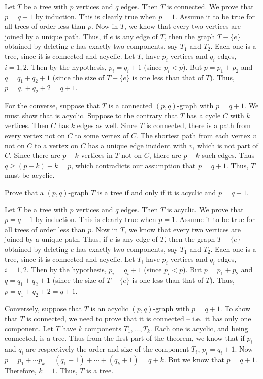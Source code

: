 \begin{Solution*}
Let $T$ be a tree with $p$ vertices and $q$ edges. Then $T$ is connected. We prove that $p = q + 1$ by induction. This is clearly true when $p = 1$. Assume it to be true for all trees of order less than $p$. Now in $T$, we know that every two vertices are joined by a unique path. Thus, if $e$ is any edge of $T$, then the graph $T - \{e\}$ obtained by deleting $e$ has exactly two components, say $T_1$ and $T_2$. Each one is a tree, since it is connected and acyclic. Let $T_i$ have $p_i$ vertices and $q_i$ edges, $i = 1, 2$. Then by the hypothesis, $p_i = q_i + 1$ (since $p_i < p$). But $p = p_1 + p_2$ and $q = q_1 + q_2 + 1$ (since the size of $T - \{e\}$ is one less than that of $T$). Thus, $p = q_1 + q_2 + 2 = q + 1$.

For the converse, suppose that $T$ is a connected $(p,q)$-graph with $p = q + 1$. We must show that is acyclic. Suppose to the contrary that $T$ has a cycle $C$ with $k$ vertices. Then $C$ has $k$ edges as well. Since $T$ is connected, there is a path from every vertex not on $C$ to some vertex of $C$. The shortest path from each vertex $v$ not on $C$ to a vertex on $C$ has a unique edge incident with $v$, which is not part of $C$. Since there are $p - k$ vertices in $T$ not on $C$, there are $p - k$ such edges. Thus $q \ge (p - k) + k = p$, which contradicts our assumption that $p = q + 1$. Thus, $T$ must be acyclic.
\end{Solution*}

\begin{DExercise}\label{exer:Acyc;p=q+1}
Prove that a $(p,q)$-graph $T$ is a tree if and only if it is acyclic and $p = q + 1$.
\end{DExercise}

\begin{Solution*}
Let $T$ be a tree with $p$ vertices and $q$ edges. Then $T$ is acyclic. We prove that $p = q + 1$ by induction. This is clearly true when $p = 1$. Assume it to be true for all trees of order less than $p$. Now in $T$, we know that every two vertices are joined by a unique path. Thus, if $e$ is any edge of $T$, then the graph $T - \{e\}$ obtained by deleting $e$ has exactly two components, say $T_1$ and $T_2$. Each one is a tree, since it is connected and acyclic. Let $T_i$ have $p_i$ vertices and $q_i$ edges, $i = 1, 2$. Then by the hypothesis, $p_i = q_i + 1$ (since $p_i < p$). But $p = p_1 + p_2$ and $q = q_1 + q_2 + 1$ (since the size of $T - \{e\}$ is one less than that of $T$). Thus, $p = q_1 + q_2 + 2 = q + 1$.

Conversely, suppose that $T$ is an acyclic $(p,q)$-graph with $p = q + 1$. To show that $T$ is connected, we need to prove that it is connected -- i.e.\ it has only one component. Let $T$ have $k$ components $T_1, \ldots, T_k$. Each one is acyclic, and being connected, is a tree. Thus from the first part of the theorem, we know that if $p_i$ and $q_i$ are respectively the order and size of the component $T_i$, $p_i = q_i + 1$. Now $p = p_1 + \cdots p_k = (q_1 + 1) + \cdots + (q_k + 1) = q + k$. But we know that $p = q + 1$. Therefore, $k = 1$. Thus, $T$ is a tree.
\end{Solution*}

